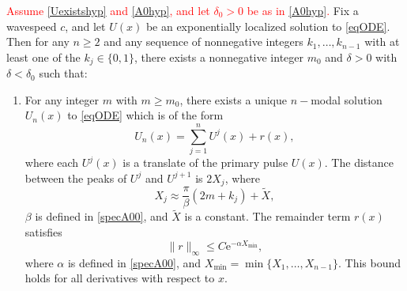 \documentclass[review,onefignum,onetabnum]{siamart171218}
\newcommand{\rme}{\mathrm{e}}
\newcommand{\revised}[1]{ \textcolor{red}{#1} }
\begin{document}
\begin{theorem}\label{multiexist}
\revised{
Assume \cref{Uexistshyp} and \cref{A0hyp}, and let $\delta_0 > 0$ be as in \cref{A0hyp}.
}
Fix a wavespeed $c$, and let $U(x)$ be an exponentially localized solution to \cref{eqODE}. Then for any $n \geq 2$ and any sequence of nonnegative integers $k_1, \dots, k_{n-1}$ with at least one of the $k_j \in \{0, 1 \}$, there exists a nonnegative integer $m_0$ and $\delta > 0$ with $\delta < \delta_0$ such that:
\begin{enumerate}%
	\item For any integer $m$ with $m \geq m_0$, there exists a unique $n-$modal solution $U_n(x)$ to \cref{eqODE} which is of the form
	\begin{equation}\label{qn}
	U_n(x) = \sum_{j = 1}^{n} U^j(x) + r(x),
	\end{equation}
	where each $U^j(x)$ is a translate of the primary pulse $U(x)$. The distance between the peaks of $U^j$ and $U^{j+1}$ is $2 X_j$, where
	\begin{equation*}
	X_j \approx \frac{\pi}{\beta}(2 m + k_j) + \tilde{X},
	\end{equation*}
	$\beta$ is defined in \cref{specA00}, and $\tilde{X}$ is a constant. The remainder term $r(x)$ satisfies
	\begin{equation}\label{rbound}
	\|r\|_\infty \leq C \rme^{-\alpha X_{\mathrm{min}}},
	\end{equation}
	where $\alpha$ is defined in \cref{specA00}, and $X_{\mathrm{min}} = \min\{X_1, \dots, X_{n-1}\}$. This bound holds for all derivatives with respect to $x$.


\end{enumerate}
\end{theorem}
\end{document}
